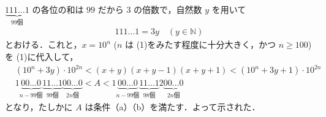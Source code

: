 \documentclass[../../main.tex]{subfiles}
\begin{document}
$\underbrace{111 \dots 1}_{99\text{個}}$ の各位の和は $99$ だから $3$ の倍数で，自然数 $y$ を用いて
\begin{align}
  111 \dots 1 = 3y \quad (y \in \mathbb{N})
\end{align}
とおける．これと，$x = 10^n$ ($n$ は (1)をみたす程度に十分大きく，かつ $n \ge 100$) を (1)に代入して，
\begin{align}
  & (10^n + 3y) \cdot 10^{2n} < (x+y)(x+y-1)(x+y+1) < (10^n + 3y + 1) \cdot 10^{2n} \\
  & 1\underbrace{00\dots0}_{n-99\text{個}}\underbrace{11\dots1}_{99\text{個}}\underbrace{00\dots0}_{2n\text{個}} < A < 1\underbrace{00\dots0}_{n-99\text{個}}\underbrace{11\dots1}_{98\text{個}}2\underbrace{00\dots0}_{2n\text{個}}
\end{align}
となり，たしかに $A$ は条件（a）（b）を満たす．よって示された．
\end{document}
